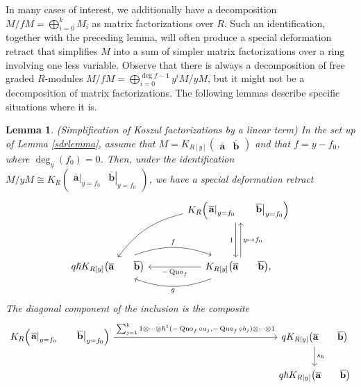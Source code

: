\documentclass{article}
\DeclareMathOperator{\Quo}{Quo}
\newcommand{\kmf}[2]{
	K_{#1}{\begin{pmatrix}
			#2
		\end{pmatrix}
	}	
}
\theoremstyle{plain} %
\newtheorem{lemma}[theorem]{Lemma}
\theoremstyle{definition} %
\theoremstyle{remark} %
\begin{document}
In many cases of interest, we additionally have a decomposition $M/fM=\bigoplus_{i=0}^{k}M_i$ as matrix factorizations over $R$. Such an identification, together with the preceding lemma, will often produce a special deformation retract that simplifies $M$ into a sum of simpler matrix factorizations over a ring involving one less variable. Observe that there is always a decomposition of free graded $R$-modules $M/fM=\bigoplus_{i=0}^{\deg{f}-1}y^i M/yM$, but it might not be a decomposition of matrix factorizations. The following lemmas describe specific situations where it is.


\begin{lemma}\label{lemma:sdrkoszullinear} \emph{(Simplification of Koszul factorizations by a linear term)}
	In the set up of Lemma \ref{sdrlemma}, assume that $M=\kmf{R[y]}{\mathbf{\overline a} &\mathbf{\overline b}}$
	and that 
	$f=y-f_0$, where $\deg_y(f_0)=0$. Then, under the identification 
	$M/yM\cong \kmf{R}{\left.\mathbf{\overline a}\right|_{y=f_0} & \left.\mathbf{\overline b}\right|_{y=f_0}}$,
	we have a special deformation retract
	$$
	\begin{tikzcd}[column sep=large]
		&
		\kmf{R}{\left.\mathbf{\overline a}\right|_{y=f_0} & \left.\mathbf{\overline b}\right|_{y=f_0}}
		\ar[dd, shift right=0.6ex, "1", swap]
		\ar[dd, leftarrow, shift left=0.6ex, "y\mapsto f_0"]
		\arrow[ddl, "{}", bend right=20, swap]
		\\\\
		q\hslash\kmf{R[y]}{\mathbf{\overline a} & \mathbf{\overline b}}
		\arrow[r, "f", shift left=0.5ex, bend left=20]
		& 
		 \kmf{R[y]}{\mathbf{\overline a} & \mathbf{\overline b}}
		\ar[l, "-\Quo_f"]
		\arrow[l, "g", shift left=0.5ex, bend left=20], 
	\end{tikzcd}
	$$
	The diagonal component of the inclusion is the composite
	$$
	\begin{tikzcd}[column sep=6cm]
		\kmf{R}{\left.\mathbf{\overline a}\right|_{y=f_0} & \left.\mathbf{\overline b}\right|_{y=f_0}} 
		\arrow[r, "{\sum_{j=1}^k1\otimes\cdots \otimes\hslash^1(-\Quo_f\circ a_j,-\Quo_f\circ b_j)\otimes\cdots\otimes 1}"] 
		&
		q\kmf{R[y]}{\mathbf{\overline a} & \mathbf{\overline b}}
		\arrow[d,"s_\hslash"] 	
		\\
		&
		q\hslash\kmf{R[y]}{\mathbf{\overline a} & \mathbf{\overline b}}
	\end{tikzcd}
	$$
\end{lemma}
\end{document}
